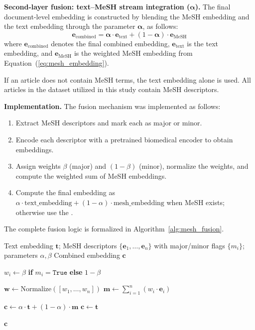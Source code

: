 \documentclass[authorproof,JACIII,researchpaper]{fujipressarticle}
\begin{document}
{\color{red}%
\noindent\textbf{Second-layer fusion: text--MeSH stream integration ($\boldsymbol{\alpha}$).}
The final document-level embedding is constructed by blending the MeSH embedding and the text embedding through the parameter $\boldsymbol{\alpha}$, as follows:
\begin{equation}
\boldsymbol{e}_{\text{combined}} = \boldsymbol{\alpha} \cdot \boldsymbol{e}_{\text{text}} + (1 - \boldsymbol{\alpha}) \cdot \boldsymbol{e}_{\text{MeSH}}
\label{eq:combined_embedding}
\end{equation}
where $\boldsymbol{e}_{\text{combined}}$ denotes the final combined embedding, $\boldsymbol{e}_{\text{text}}$ is the text embedding, and $\boldsymbol{e}_{\text{MeSH}}$ is the weighted MeSH embedding from Equation~(\ref{eq:mesh_embedding}).
}%

If an article does not contain MeSH terms, the text embedding alone is used.
All articles in the dataset utilized in this study contain MeSH descriptors.

{\color{red}%
\noindent\textbf{Implementation.}
The fusion mechanism was implemented as follows:
\begin{enumerate}[leftmargin=*,label=\arabic*.]
    \item Extract MeSH descriptors and mark each as major or minor.
    \item Encode each descriptor with a pretrained biomedical encoder to obtain embeddings.
    \item Assign weights $\beta$ (major) and $(1-\beta)$ (minor), normalize the weights, and compute the weighted sum of MeSH embeddings.
    \item Compute the final embedding as $\alpha\cdot\text{text\_embedding} + (1-\alpha)\cdot\text{mesh\_embedding}$ when MeSH exists; otherwise use the .
\end{enumerate}
}%

The complete fusion logic is formalized in Algorithm~\ref{alg:mesh_fusion}.

\begin{algorithm}[H]
\caption{Text--MeSH Fusion with Major/Minor Weights}
\label{alg:mesh_fusion}
\begin{algorithmic}[1]
\Require Text embedding $\boldsymbol{t}$; MeSH descriptors $\{\boldsymbol{e}_1,\ldots,\boldsymbol{e}_n\}$ with major/minor flags $\{m_i\}$; parameters $\alpha,\beta$
\Ensure Combined embedding $\boldsymbol{c}$

    \State $w_i \gets \beta$ \textbf{if} $m_i = \texttt{True}$ \textbf{else} $1-\beta$
\EndFor

\State $\boldsymbol{w} \gets \mathrm{Normalize}([w_1,\ldots,w_n])$
\State $\boldsymbol{m} \gets \sum_{i=1}^{n} (w_i \cdot \boldsymbol{e}_i)$

    \State $\boldsymbol{c} \gets \alpha \cdot \boldsymbol{t} + (1-\alpha) \cdot \boldsymbol{m}$
\Else
    \State $\boldsymbol{c} \gets \boldsymbol{t}$
\EndIf

\State \Return $\boldsymbol{c}$
\end{algorithmic}
\end{algorithm}
\end{document}
